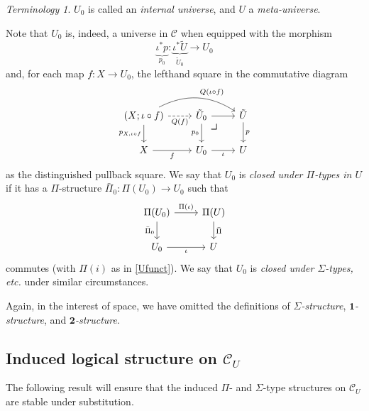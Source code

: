 \documentclass[10pt,letterpaper,cm]{nupset}
\theoremstyle{definition}
\theoremstyle{theorem}
\theoremstyle{remark}
\newtheorem*{term}{Terminology}
\newcommand{\0}{\mathbf{0}}
\newcommand{\1}{\mathbf{1}}
\newcommand{\2}{\mathbf{2}}
\renewcommand{\c}{\mathscr{C}}
\begin{document}
\begin{term}
$U_0$ is called an \textit{internal universe}, and $U$ a \textit{meta-universe}.
\end{term}

\medskip

Note that $U_0$ is, indeed, a universe in $\c$ when equipped with the morphism $$\underbrace{\iota^{\ast}{p}}_{p_0} :  \underbrace{\iota^{\ast}{\tilde{U}}}_{\tilde{U}_0} \to U_0 $$ and, for each map $f: X \to U_0$, the lefthand square in the commutative diagram
\[
\begin{tikzcd}
\left(X; \iota \circ f\right) \arrow[d, "{p_{X, \iota \circ f}}"'] \arrow[r, "Q(f)"', dashed] \arrow[rr, "Q(\iota \circ f)", bend left] & \tilde{U}_0 \arrow[d, "p_0"'] \arrow[r]  \arrow[dr, phantom, "\scalebox{1.5}{\color{black}$\lrcorner$}", very near start] & \tilde{U} \arrow[d, "p"] \\
X \arrow[r, "f"']                                                                                                                       & U_0 \arrow[r, "\iota"']                & U                       
\end{tikzcd}
\] as the distinguished pullback square. We say that $U_0$ is \textit{closed under $\Pi$-types in $U$} if it has a $\Pi$-structure $\bar{\Pi}_0 : \Pi(U_0) \to U_0$ such that 
\[
\begin{tikzcd}
\Pi(U_0) \arrow[d, "\bar{\Pi}_0"'] \arrow[r, "\Pi(\iota)"] & \Pi(U) \arrow[d, "\bar{\Pi}"] \\
U_0 \arrow[r, "\iota"']                                 & U                         
\end{tikzcd}
\]
 commutes (with $\Pi(i)$ as in \cref{Ufunct}). We say that $U_0$ is \textit{closed under $\Sigma$-types, etc.} under similar circumstances.

\bigskip

Again, in the interest of space, we have omitted the definitions of \textit{$\Sigma$-structure}, \textit{$\1$-structure}, and \textit{$\2$-structure}.

\subsection*{Induced logical structure on $\c_U$}

The following result will ensure that the induced $\Pi$- and $\Sigma$-type structures on $\c_U$ are stable under substitution.
\end{document}
